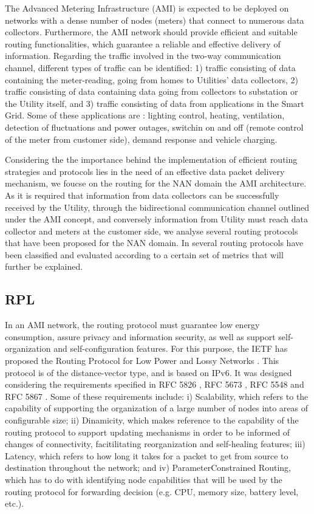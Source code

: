 \documentclass[11pt,draftclsnofoot,onecolumn]{IEEEtran}
\begin{document}
The Advanced Metering Infrastructure (AMI) is expected to be deployed on networks with a dense number of nodes (meters) that connect to numerous data collectors. Furthermore, the AMI network should provide efficient and suitable routing functionalities, which guarantee a reliable and effective delivery of information. Regarding the traffic involved in the two-way communication channel, different types of traffic can be identified: 1) traffic consisting of data containing the meter-reading, going from homes to Utilities’ data collectors, 2) traffic consisting of data containing data going from collectors to substation or the Utility itself, and 3) traffic consisting of data from applications in the Smart Grid. Some of these applications are \cite{Tan2011}: lighting control, heating, ventilation, detection of fluctuations and power outages, switchin on and off (remote control of the meter from customer side), demand response and vehicle charging. 

Considering the the importance behind the implementation of efficient routing strategies and protocols lies in the need of an effective data packet delivery mechanism, we foucse on the routing for the NAN domain the AMI architecture. As it is required that information from data collectors can be successfully received by the Utility, through the bidirectional communication channel outlined under the AMI concept, and conversely information from Utility must reach data collector and meters at the customer side, we analyse several routing protocols that have been proposed for the NAN domain. In \cite{Sabbah2014} several routing protocols have been classified and evaluated according to a certain set of metrics that will further be explained. 

\subsection{RPL}\label{rpl}

In an AMI network, the routing protocol must guarantee low energy consumption, assure privacy and information security, as well as support self-organization and self-configuration features. For this purpose, the IETF has proposed the Routing Protocol for Low Power and Lossy Networks \cite{Winter2012}. This protocol is of the distance-vector type, and is based on IPv6. It was designed considering the requirements specified in RFC 5826 \cite{Brandt2010}, RFC 5673 \cite{Pister2009}, RFC 5548 \cite{Dohler2009} and RFC 5867 \cite{Martocci2010}. Some of these requirements include: i) Scalability, which refers to the capability of supporting the organization of a large number of nodes into areas of configurable size; ii) Dinamicity, which makes reference to the capability of the routing protocol to support updating mechanisms in order to be informed of changes of connectivity, facitilitating reorganization and self-healing features; iii) Latency, which refers to how long it takes for a packet to get from source to destination throughout the network; and iv) ParameterConstrained Routing, which has to do with identifying node capabilities that will be used by the routing protocol for forwarding decision (e.g. CPU, memory size, battery level, etc.).
\end{document}
